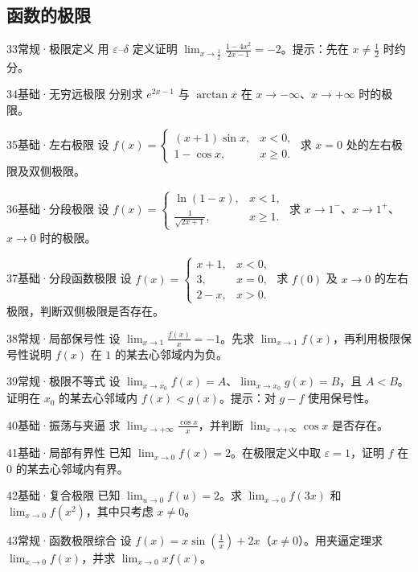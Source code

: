 \subsection{函数的极限}
\begin{exercise}{33}{常规·极限定义}
用 $\varepsilon$--$\delta$ 定义证明 $\lim_{x\to\frac{1}{2}}\frac{1-4x^2}{2x-1}=-2$。提示：先在 $x\ne\frac{1}{2}$ 时约分。
\end{exercise}
\begin{exercise}{34}{基础·无穷远极限}
分别求 $e^{2x-1}$ 与 $\arctan x$ 在 $x\to-\infty$、$x\to+\infty$ 时的极限。
\end{exercise}
\begin{exercise}{35}{基础·左右极限}
设 $f(x)=\begin{cases}(x+1)\sin x,&x<0,\\1-\cos x,&x\ge0.\end{cases}$ 求 $x=0$ 处的左右极限及双侧极限。
\end{exercise}
\begin{exercise}{36}{基础·分段极限}
设 $f(x)=\begin{cases}\ln(1-x),&x<1,\\\frac{1}{\sqrt{2x+1}},&x\ge1.\end{cases}$ 求 $x\to1^-$、$x\to1^+$、$x\to0$ 时的极限。
\end{exercise}
\begin{exercise}{37}{基础·分段函数极限}
设 $f(x)=\begin{cases}x+1,&x<0,\\3,&x=0,\\2-x,&x>0.\end{cases}$ 求 $f(0)$ 及 $x\to0$ 的左右极限，判断双侧极限是否存在。
\end{exercise}
\begin{exercise}{38}{常规·局部保号性}
设 $\lim_{x\to1}\frac{f(x)}{x}=-1$。先求 $\lim_{x\to1}f(x)$，再利用极限保号性说明 $f(x)$ 在 $1$ 的某去心邻域内为负。
\end{exercise}
\begin{exercise}{39}{常规·极限不等式}
设 $\lim_{x\to x_0}f(x)=A$、$\lim_{x\to x_0}g(x)=B$，且 $A<B$。证明在 $x_0$ 的某去心邻域内 $f(x)<g(x)$。提示：对 $g-f$ 使用保号性。
\end{exercise}
\begin{exercise}{40}{基础·振荡与夹逼}
求 $\lim_{x\to+\infty}\frac{\cos x}{x}$，并判断 $\lim_{x\to+\infty}\cos x$ 是否存在。
\end{exercise}
\begin{exercise}{41}{基础·局部有界性}
已知 $\lim_{x\to0}f(x)=2$。在极限定义中取 $\varepsilon=1$，证明 $f$ 在 $0$ 的某去心邻域内有界。
\end{exercise}
\begin{exercise}{42}{基础·复合极限}
已知 $\lim_{u\to0}f(u)=2$。求 $\lim_{x\to0}f(3x)$ 和 $\lim_{x\to0}f(x^2)$，其中只考虑 $x\ne0$。
\end{exercise}
\begin{exercise}{43}{常规·函数极限综合}
设 $f(x)=x\sin(\frac{1}{x})+2x$（$x\ne0$）。用夹逼定理求 $\lim_{x\to0}f(x)$，并求 $\lim_{x\to0}xf(x)$。
\end{exercise}
